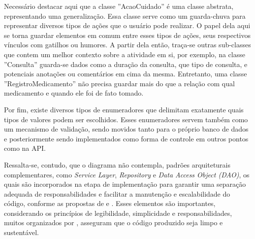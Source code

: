 Necessário destacar aqui que a classe ''AcaoCuidado'' é uma classe abstrata,
representando uma generalização. Essa classe serve como um guarda-chuva para
representar diversos tipos de ações que o usuário pode realizar. O papel dela
aqui se torna guardar elementos em comum entre esses tipos de ações, seus
respectivos vínculos com gatilhos ou humores. A partir dela então, traça-se
outras sub-classes que contem um melhor contexto sobre a atividade em si, por
exemplo, na classe ''Consulta'' guarda-se dados como a duração da consulta, que
tipo de consulta, e potenciais anotações ou comentários em cima da mesma.
Entretanto, uma classe ''RegistroMedicamento'' não precisa guardar mais do que
a relação com qual medicamento e quando ele foi de fato tomado.

Por fim, existe diversos tipos de enumeradores que delimitam exatamente quais
tipos de valores podem ser escolhidos. Esses enumeradores servem também como um
mecanismo de validação, sendo movidos tanto para o próprio banco de dados e
posteriormente sendo implementados como forma de controle em outros pontos como
na API.

Ressalta-se, contudo, que o diagrama não contempla, padrões arquiteturais
complementares, como \textit{Service Layer}, \textit{Repository} e \textit{Data
Access Object (DAO)}, os quais são incorporados na etapa de implementação para
garantir uma separação adequada de responsabilidades e facilitar a manutenção e
escalabilidade do código, conforme as propostas de \citet{Fowler_2013} e
\citet{Gamma:2011}. Esses elementos são importantes, considerando os princípios
de legibilidade, simplicidade e responsabilidades, muitos organizados por
\citet{Martin_2012}, asseguram que o código produzido seja limpo e sustentável.
